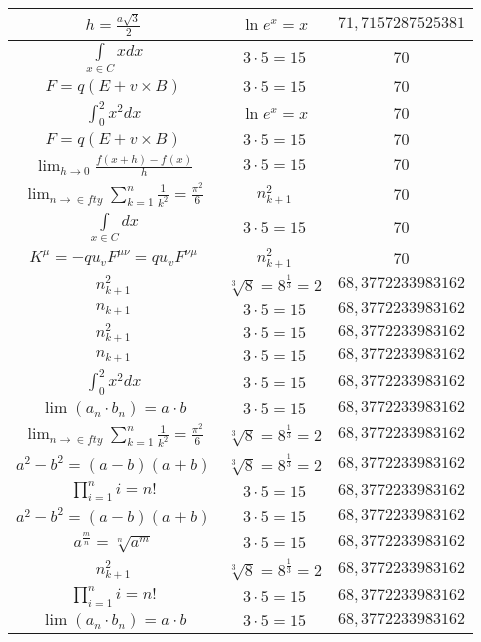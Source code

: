 \documentclass{article}
\begin{document}
\begin{flushleft}
\begin{longtable}{|c|c|c|}
$h=\frac{a\sqrt{3}}{2}$ & $\ln e^x=x$ & $71,7157287525381$ \\ \hline 
$\int \limits_{x\in C}xdx$ & $3\cdot 5=15$ & $70$ \\ \hline 
$F=q\left(E+v\times B\right)$ & $3\cdot 5=15$ & $70$ \\ \hline 
$\int _0^2x^2dx$ & $\ln e^x=x$ & $70$ \\ \hline 
$F=q\left(E+v\times B\right)$ & $3\cdot 5=15$ & $70$ \\ \hline 
$\lim_{h\to0}\frac{f(x+h)-f(x)}{h}$ & $3\cdot 5=15$ & $70$ \\ \hline 
$\lim_{n\to\in fty}\sum_{k=1}^n\frac{1}{k^2}=\frac{\pi^2}{6}$ & $n_{k+1}^2$ & $70$ \\ \hline 
$\int \limits_{x\in C}dx$ & $3\cdot 5=15$ & $70$ \\ \hline 
$K^\mu=-qu_vF^{\mu\nu}=qu_vF^{\nu\mu}$ & $n_{k+1}^2$ & $70$ \\ \hline 
$n_{k+1}^2$ & $\sqrt[3]{8}=8^{\frac{1}{3}}=2$ & $68,3772233983162$ \\ \hline 
$n_{k+1}$ & $3\cdot 5=15$ & $68,3772233983162$ \\ \hline 
$n_{k+1}^2$ & $3\cdot 5=15$ & $68,3772233983162$ \\ \hline 
$n_{k+1}$ & $3\cdot 5=15$ & $68,3772233983162$ \\ \hline 
$\int _0^2x^2dx$ & $3\cdot 5=15$ & $68,3772233983162$ \\ \hline 
$\lim\left(a_n\cdot b_n\right)=a\cdot b$ & $3\cdot 5=15$ & $68,3772233983162$ \\ \hline 
$\lim_{n\to\in fty}\sum_{k=1}^n\frac{1}{k^2}=\frac{\pi^2}{6}$ & $\sqrt[3]{8}=8^{\frac{1}{3}}=2$ & $68,3772233983162$ \\ \hline 
$a^2-b^2=(a-b)(a+b)$ & $\sqrt[3]{8}=8^{\frac{1}{3}}=2$ & $68,3772233983162$ \\ \hline 
$\prod_{i=1}^ni=n!$ & $3\cdot 5=15$ & $68,3772233983162$ \\ \hline 
$a^2-b^2=(a-b)(a+b)$ & $3\cdot 5=15$ & $68,3772233983162$ \\ \hline 
$a^{\frac{m}{n}}=\sqrt[n]{a^{m}}$ & $3\cdot 5=15$ & $68,3772233983162$ \\ \hline 
$n_{k+1}^2$ & $\sqrt[3]{8}=8^{\frac{1}{3}}=2$ & $68,3772233983162$ \\ \hline 
$\prod_{i=1}^ni=n!$ & $3\cdot 5=15$ & $68,3772233983162$ \\ \hline 
$\lim\left(a_n\cdot b_n\right)=a\cdot b$ & $3\cdot 5=15$ & $68,3772233983162$ \\ \hline 

\end{longtable}
\end{flushleft}
\end{document}
